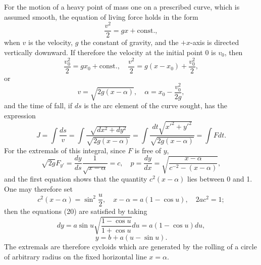 \documentclass[11pt,a4paper,leqno]{article}
\begin{document}
For the motion of a heavy point of mass one on a prescribed curve, which is assumed smooth, the equation of living force holds in the form
\[
\frac{v^2}{2}=gx+\mathrm{const.},
\]
when $v$ is the velocity, $g$ the constant of gravity, and the $+x$-axis is directed vertically downward. If therefore the velocity at the initial point 0 is $v_0$, then
\[
\frac{v_0^2}{2}=gx_0+\mathrm{const.},\quad \frac{v^2}{2}=g(x-x_0)+\frac{v_0^2}{2},
\]
or
\[
v=\sqrt{2g(x-\alpha)},\quad \alpha=x_0-\frac{v_0^2}{2g},
\]
and the time of fall, if $ds$ is the arc element of the curve sought, has the expression
\[
J=\int\frac{ds}{v}=\int\frac{\sqrt{dx^2+dy^2}}{\sqrt{2g(x-\alpha)}}=\int\frac{dt\sqrt{x'^2+y'^2}}{\sqrt{2g(x-\alpha)}}=\int Fdt.
\]
For the extremals of this integral, since $F$ is free of $y$,
\begin{equation}\tag{20}
\sqrt{2g}F_{y'}=\frac{dy}{ds}\frac{1}{\sqrt{x-\alpha}}=c,\quad
p=\frac{dy}{dx}=\sqrt{\frac{x-\alpha}{c^{-2}-(x-\alpha)}},
\end{equation}
and the first equation shows that the quantity $c^2(x-\alpha)$ lies between 0 and 1. One may therefore set
\[
c^2(x-\alpha)=\sin^2\frac{u}{2},\quad x-\alpha=a(1-\cos u),\quad 2ac^2=1;
\]
then the equations (20) are satisfied by taking
\[
dy=a\sin u\sqrt{\frac{1-\cos u}{1+\cos u}}du=a(1-\cos u)du,
\]
\[
y=b+a(u-\sin u).
\]
The extremals are therefore cycloids which are generated by the rolling of a circle of arbitrary radius on the fixed horizontal line $x=\alpha$.
\end{document}
